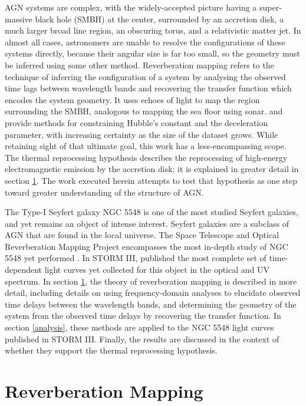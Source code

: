 \documentclass[11pt,letterpaper]{article}
\begin{document}
AGN systems are complex, with the widely-accepted picture having a super-massive black hole (SMBH) at the center, surrounded by an accretion disk, a much larger broad line region, an obscuring torus, and a relativistic matter jet. In almost all cases, astronomers are unable to resolve the configurations of these systems directly, because their angular size is far too small, so the geometry must be inferred using some other method. Reverberation mapping refers to the technique of inferring the configuration of a system by analysing the observed time lags between wavelength bands and recovering the transfer function which encodes the system geometry. It uses echoes of light to map the region surrounding the SMBH, analogous to mapping the sea floor using sonar. \cite{1999MNRAS.302L..24C} and \cite{2007MNRAS.380..669C} provide methods for constraining Hubble's constant and the deceleration parameter, with increasing certainty as the size of the dataset grows. While retaining sight of that ultimate goal, this work has a less-encompassing scope. The thermal reprocessing hypothesis describes the reprocessing of high-energy electromagnetic emission by the accretion disk; it is explained in greater detail in section \ref{sec:reverbmap}. The work executed herein attempts to test that hypothesis as one step toward greater understanding of the structure of AGN.  

The Type-I Seyfert galaxy NGC 5548 is one of the most studied Seyfert galaxies, and yet remains an object of intense interest. Seyfert galaxies are a subclass of AGN that are found in the local universe. The Space Telescope and Optical Reverberation Mapping Project encompasses the most in-depth study of NGC 5548 yet performed \citep{2015ApJ...806..128D} \citep{2015ApJ...806..129E} \citep{2016ApJ...821...56F}. In STORM III, \cite{2016ApJ...821...56F} published the most complete set of time-dependent light curves yet collected for this object in the optical and UV spectrum. In section \ref{sec:reverbmap}, the theory of reverberation mapping is described in more detail, including details on using frequency-domain analyses to elucidate observed time delays between the wavelength bands, and determining the geometry of the system from the observed time delays by recovering the transfer function. In section \ref{analysis}, these methods are applied to the NGC 5548 light curves published in STORM III. Finally, the results are discussed in the context of whether they support the thermal reprocessing hypothesis.


\section{Reverberation Mapping}
\label{sec:reverbmap}
\end{document}
